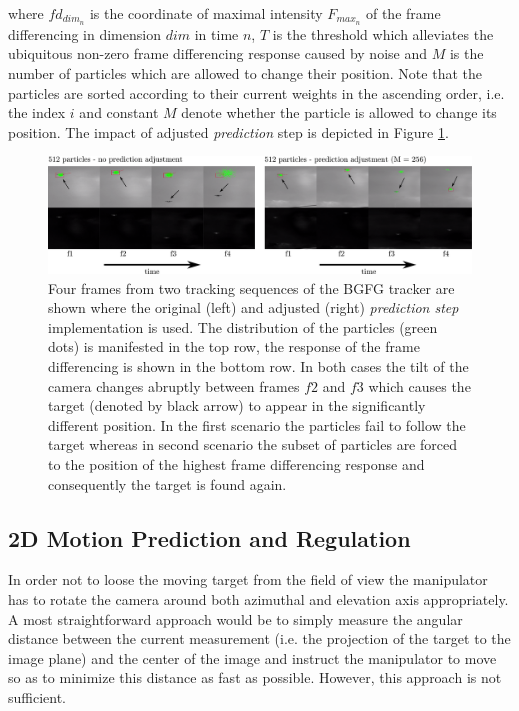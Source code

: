 where $fd_{dim_{n}}$ is the coordinate of maximal intensity $F_{max_{n}}$ of the frame differencing in dimension $dim$ in time $n$, $T$ is the threshold which alleviates the ubiquitous non-zero frame differencing response caused by noise and $M$ is the number of particles which are allowed to change their position. Note that the particles are sorted according to their current weights in the ascending order, i.e. the index $i$ and constant $M$ denote whether the particle is allowed to change its position. The impact of adjusted \textit{prediction} step is depicted in Figure \ref{fig:frame_diff}. 

\begin{figure}[htb]
	\centering
	\includegraphics[width=0.99\linewidth]{fig/frame_diff.pdf}
	\caption{Four frames from two tracking sequences of the BGFG tracker are shown where the original (left) and adjusted (right) \textit{prediction step} implementation is used. The distribution of the particles (green dots) is manifested in the top row, the response of the frame differencing is shown in the bottom row. In both cases the tilt of the camera changes abruptly between frames $f 2$ and $f 3$ which causes the target (denoted by black arrow) to appear in the significantly different position. In the first scenario the particles fail to follow the target whereas in second scenario the subset of particles are forced to the position of the highest frame differencing response and consequently the target is found again.}
	\label{fig:frame_diff}
\end{figure}

\subsection{2D Motion Prediction and Regulation} \label{txt:2d_motion_prediction_and_regulation}

In order not to loose the moving target from the field of view the manipulator has to rotate the camera around both azimuthal and elevation axis appropriately. A most straightforward approach would be to simply measure the angular distance between the current measurement (i.e. the projection of the target to the image plane) and the center of the image and instruct the manipulator to move so as to minimize this distance as fast as possible. However, this approach is not sufficient. 


